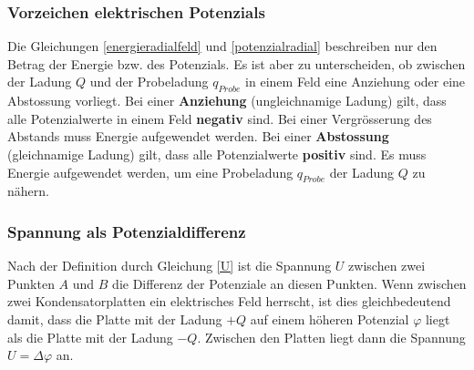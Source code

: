 \documentclass[11pt,twoside=false,open=any]{scrbook}
\begin{document}
\subsubsection{Vorzeichen elektrischen Potenzials}
Die Gleichungen \ref{energieradialfeld} und \ref{potenzialradial} beschreiben nur den Betrag der Energie bzw. des Potenzials. Es ist aber zu unterscheiden, ob zwischen der Ladung $Q$ und der Probeladung $q_{Probe}$ in einem Feld eine Anziehung oder eine Abstossung vorliegt. Bei einer \textbf{Anziehung} (ungleichnamige Ladung) gilt, dass alle Potenzialwerte in einem Feld \textbf{negativ} sind. Bei einer Vergrösserung des Abstands muss Energie aufgewendet werden. Bei einer \textbf{Abstossung} (gleichnamige Ladung) gilt, dass alle Potenzialwerte \textbf{positiv} sind. Es muss Energie aufgewendet werden, um eine Probeladung $q_{Probe}$ der Ladung $Q$ zu nähern.

\subsubsection{Spannung als Potenzialdifferenz}

Nach der Definition durch Gleichung \ref{U} ist die Spannung $U$ zwischen zwei Punkten $A$ und $B$ die Differenz der Potenziale an diesen Punkten. Wenn zwischen zwei Kondensatorplatten ein elektrisches Feld  herrscht, ist dies gleichbedeutend damit, dass die Platte mit der Ladung $+Q$ auf einem höheren Potenzial $\varphi$ liegt als die Platte mit der Ladung $-Q$. Zwischen den Platten liegt dann die Spannung $U=\Delta \varphi$ an.

\begin{center}
   \setlength{\fboxrule}{2pt}
\end{center}
\end{document}
